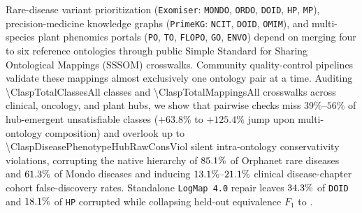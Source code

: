 \documentclass[10pt]{article}
\begin{document}
Rare-disease variant prioritization (\texttt{Exomiser}: \texttt{MONDO}, \texttt{ORDO}, \texttt{DOID}, \texttt{HP}, \texttt{MP}), precision-medicine knowledge graphs (\texttt{PrimeKG}: \texttt{NCIT}, \texttt{DOID}, \texttt{OMIM}), and multi-species plant phenomics portals (\texttt{PO}, \texttt{TO}, \texttt{FLOPO}, \texttt{GO}, \texttt{ENVO}) depend on merging four to six reference ontologies through public Simple Standard for Sharing Ontological Mappings (SSSOM) crosswalks. Community quality-control pipelines validate these mappings almost exclusively one ontology pair at a time. Auditing \num{\ClaspTotalClassesAll} classes and \num{\ClaspTotalMappingsAll} crosswalks across clinical, oncology, and plant hubs, we show that pairwise checks miss $39\%\text{--}56\%$ of hub-emergent unsatisfiable classes ($+63.8\%$ to $+125.4\%$ jump upon multi-ontology composition) and overlook up to \num{\ClaspDiseasePhenotypeHubRawConsViol} silent intra-ontology conservativity violations, corrupting the native hierarchy of $85.1{}\%$ of Orphanet rare diseases and $61.3{}\%$ of Mondo diseases and inducing $13.1{}\%\text{--}21.1{}\%$ clinical disease-chapter cohort false-discovery rates. Standalone \texttt{LogMap~4.0} repair leaves $34.3{}\%$ of \texttt{DOID} and $18.1{}\%$ of \texttt{HP} corrupted while collapsing held-out equivalence $F_1$ to \ClaspOAEIBioMLBLogMapRepairEquivFone{}.
\end{document}
